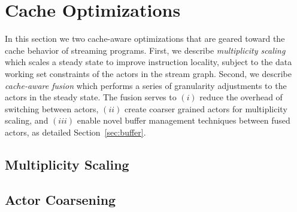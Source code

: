 \section{Cache Optimizations}
\label{sec:cache-opt}

In this section we two cache-aware optimizations that
are geared toward the cache behavior of streaming programs. First, we
describe {\it multiplicity scaling} which 
scales a steady state to improve instruction locality, subject to the
data working set constraints of the actors in the stream graph.
Second, we describe {\it cache-aware fusion} which performs a series
of granularity adjustments to the actors in the steady state. The
fusion serves to $(i)$ reduce
the overhead of switching between actors, $(ii)$ create coarser
grained actors for multiplicity scaling, and $(iii)$ enable novel
buffer management techniques between fused actors, as detailed
Section~\ref{sec:buffer}.

\subsection{Multiplicity Scaling}


\subsection{Actor Coarsening}
